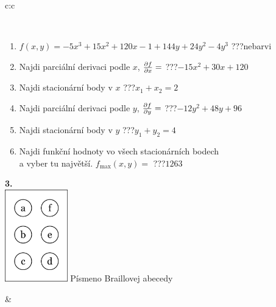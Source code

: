 \documentclass[10pt]{report}
\begin{document}
\begin{tabular}{c:c}
\begin{minipage}[c][104.5mm][t]{0.5\linewidth}
\begin{center}
\begin{minipage}{0.95\linewidth}
\begin{center}
\end{center}
\end{minipage}
\\[1mm]
\begin{minipage}{0.79\linewidth}
\begin{center}
\begin{varwidth}{\linewidth}
\begin{enumerate}
\normalsize
\item $f(x,y)=-5x^3+15x^2+120x-1+144y+24y^2-4y^3$\quad \dotfill\; ???\;\dotfill \quad nebarvi
\item Najdi parciální derivaci podle $x$, $\pdv{f}{x}=$\quad \dotfill\; ???\;\dotfill \quad $-15x^2+30x+120$
\item Najdi stacionární body v $x$\quad \dotfill\; ???\;\dotfill \quad $x_1+x_2=2$
\item Najdi parciální derivaci podle $y$, $\pdv{f}{y}=$\quad \dotfill\; ???\;\dotfill \quad $-12y^2+48y+96$
\item Najdi stacionární body v $y$\quad \dotfill\; ???\;\dotfill \quad $y_1+y_2=4$
\item Najdi funkční hodnoty vo všech stacionárních bodech \\ \phantom{xxxxxx} a vyber tu najvětší. $f_{\text{max}}(x,y)=$\quad \dotfill\; ???\;\dotfill \quad $1263$
\end{enumerate}
\end{varwidth}
\end{center}
\end{minipage}
\begin{minipage}{0.20\linewidth}
\begin{center}
{\Huge\bfseries 3.} \\[2mm]
\includegraphics[height=40mm]{../images/braille.png}
{\small Písmeno Braillovej abecedy}
\end{center}
\end{minipage}
\end{center}
\end{minipage}
&
\begin{minipage}[c][104.5mm][t]{0.5\linewidth}
\begin{center}

\end{center}
\end{minipage}
\end{tabular}
\end{document}

